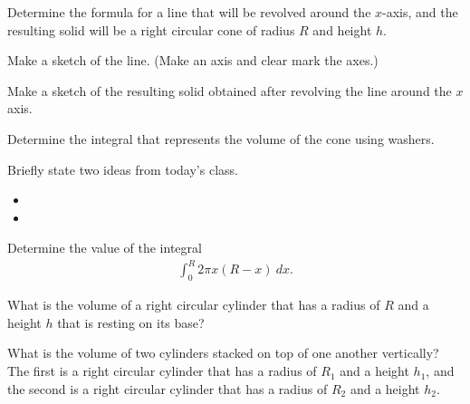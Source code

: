 \begin{problem}
\item Determine the formula for a line that will be revolved
      around the $x$-axis, and the resulting solid will be a right
      circular cone of radius $R$ and height $h$.
  \begin{subproblem}
    \item Make a sketch of the line. (Make an axis and clear mark the
      axes.)
      \vfill

    \item Make a sketch of the resulting solid obtained after
      revolving the line around the $x$ axis.
      \vfill

    \item Determine the integral that represents the volume of the
      cone using washers.
      \vfill
      
  \end{subproblem}
\end{problem}

\postClass

\begin{problem}
\item Briefly state two ideas from today's class.
  \begin{itemize}
  \item 
  \item 
  \end{itemize}
\item 
  \begin{subproblem}
    \item
  \end{subproblem}
\end{problem}



\begin{problem}
\item Determine the value of the integral
  \begin{eqnarray*}
    \int^R_0 2\pi x \left( R-x \right) ~ dx.
  \end{eqnarray*}
  \vfill

\item What is the volume of a right circular cylinder that has a
  radius of $R$ and a height $h$ that is resting on its base?  

  \vfill

\item What is the volume of two cylinders stacked on top of one
  another vertically? The first is a right circular cylinder that has a radius of
  $R_1$ and a height $h_1$, and the second is a right circular cylinder that
  has a radius of $R_2$ and a height $h_2$.  

  \vfill

\end{problem}


